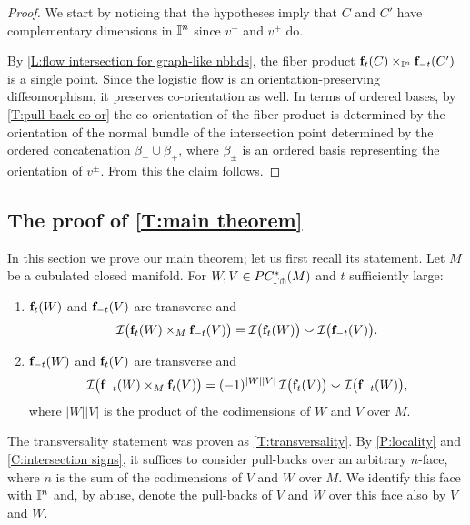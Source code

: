 \begin{proof}
	We start by noticing that the hypotheses imply that $C$ and $C'$ have complementary dimensions in $\mathbb{I}^n$ since $v^-$ and $v^+$ do.

	By \cref{L:flow intersection for graph-like nbhds}, the fiber product $\mathbf{f}_t(C) \times_{\mathbb{I}^n} \mathbf{f}_{-t}(C^\prime)$ is a single point.
	Since the logistic flow is an orientation-preserving diffeomorphism, it preserves co-orientation as well.
	In terms of ordered bases, by \cref{T:pull-back co-or} the co-orientation of the fiber product is determined by the orientation of the normal bundle of the intersection point determined by the ordered concatenation $\beta_- \cup \beta_+$, where $\beta_\pm$ is an ordered basis representing the orientation of $v^\pm$.
	From this the claim follows.
\end{proof}

\subsection{The proof of \cref{T:main theorem}}

In this section we prove our main theorem; let us first recall its statement.
Let $M$ be a cubulated closed manifold.
For $W, V \in PC_{\Gamma\pitchfork}^*(M)$ and $t$ sufficiently large:
\begin{enumerate}
	\item $\mathbf{f}_t(W)$ and $\mathbf{f}_{-t}(V)$ are transverse and
	\begin{equation*}
		\mathcal{I} \big( \mathbf{f}_t(W) \times_M \mathbf{f}_{-t}(V) \big) =
		\mathcal{I} \big( \mathbf{f}_t(W) \big) \smallsmile \mathcal{I} \big( \mathbf{f}_{-t}(V) \big).
	\end{equation*}
	\item $\mathbf{f}_{-t}(W)$ and $\mathbf{f}_t(V)$ are transverse and
	\begin{equation*}
		\mathcal{I} \big( \mathbf{f}_{-t}(W) \times_M \mathbf{f}_t(V) \big) =
		(-1)^{|W||V|} \, \mathcal{I} \big( \mathbf{f}_t(V) \big) \smallsmile \mathcal{I} \big( \mathbf{f}_{-t}(W) \big),
	\end{equation*}
	where $|W||V|$ is the product of the codimensions of $W$ and $V$ over $M$.
\end{enumerate}

The transversality statement was proven as \cref{T:transversality}.
By \cref{P:locality} and \cref{C:intersection signs}, it suffices to consider pull-backs over an arbitrary $n$-face, where $n$ is the sum of the codimensions of $V$ and $W$ over $M$.
We identify this face with $\mathbb{I}^n$ and, by abuse, denote the pull-backs of $V$ and $W$ over this face also by $V$ and $W$.

